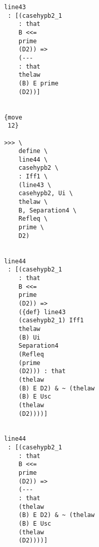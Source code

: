 \documentclass[12pt]{article}
\begin{document}
\begin{verbatim}
                                       line43 
                                        : [(casehypb2_1 
                                           : that 
                                           B <<= 
                                           prime 
                                           (D2)) => 
                                           (--- 
                                           : that 
                                           thelaw 
                                           (B) E prime 
                                           (D2))]


                                       {move 
                                        12}

                                       >>> \
                                           define \
                                           line44 \
                                           casehypb2 \
                                           : Iff1 \
                                           (line43 \
                                           casehypb2, Ui \
                                           thelaw \
                                           B, Separation4 \
                                           Refleq \
                                           prime \
                                           D2)


                                       line44 
                                        : [(casehypb2_1 
                                           : that 
                                           B <<= 
                                           prime 
                                           (D2)) => 
                                           ({def} line43 
                                           (casehypb2_1) Iff1 
                                           thelaw 
                                           (B) Ui 
                                           Separation4 
                                           (Refleq 
                                           (prime 
                                           (D2))) : that 
                                           (thelaw 
                                           (B) E D2) & ~ (thelaw 
                                           (B) E Usc 
                                           (thelaw 
                                           (D2))))]


                                       line44 
                                        : [(casehypb2_1 
                                           : that 
                                           B <<= 
                                           prime 
                                           (D2)) => 
                                           (--- 
                                           : that 
                                           (thelaw 
                                           (B) E D2) & ~ (thelaw 
                                           (B) E Usc 
                                           (thelaw 
                                           (D2))))]



\end{verbatim}
\end{document}
